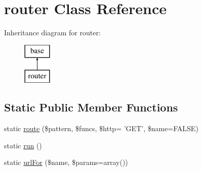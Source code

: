 \hypertarget{classrouter}{
\section{router Class Reference}
\label{classrouter}
}
Inheritance diagram for router:\begin{figure}[H]
\begin{center}
\leavevmode
\includegraphics[height=2.000000cm]{classrouter}
\end{center}
\end{figure}
\subsection*{Static Public Member Functions}
\begin{DoxyCompactItemize}
\item 
static \hyperlink{classrouter_aafd29366ef6399da1dd079fc131d8858}{route} (\$pattern, \$funcs, \$http= 'GET', \$name=FALSE)
\item 
static \hyperlink{classrouter_ad3a572002fd350672b531756f7306e8f}{run} ()
\item 
static \hyperlink{classrouter_a2c24b81993e81c6401edd6c4caff0336}{urlFor} (\$name, \$params=array())
\end{DoxyCompactItemize}


